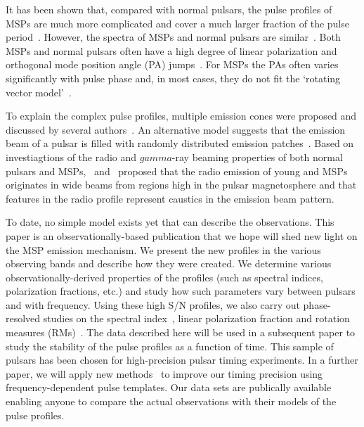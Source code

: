 \documentclass[useAMS,usenatbib]{mn2e}
\begin{document}
It has been shown that, compared with normal pulsars, the pulse profiles of MSPs are 
much more complicated and cover a much larger fraction of the pulse period~\citep{Yan11}. 
%
However, the spectra of MSPs and normal pulsars are similar~\citep{Toscano98,Kramer98,Kramer99}.
%
Both MSPs and normal pulsars often have a high degree of linear polarization and orthogonal 
mode position angle (PA) jumps~\citep[see e.g.,][]{Thorsett90,Navarro97,Stairs99,Manchester04,Ord04}.
%
For MSPs the PAs often varies significantly with pulse phase and, in most cases, they do not fit 
the `rotating vector model'~\citep[RVM,][]{Radhakrishnan69}.

To explain the complex pulse profiles, multiple emission cones were proposed 
and discussed by several authors~\citep{Rankin93,Kramer94b,Gupta03}. An alternative 
model suggests that the emission beam of a pulsar is filled with randomly 
distributed emission patches~\citep{Lyne88,Manchester95_2,Han01}. 
%
Based on investiagtions of the radio and $gamma$-ray beaming properties of both normal 
pulsars and MSPs,~\citet{Manchester05b} and~\citet{Ravi10} proposed that the radio emission 
of young and MSPs originates in wide beams from regions high in the pulsar magnetosphere 
and that features in the radio profile represent caustics in the emission beam pattern.
%

To date, no simple model exists yet that can describe the observations.  
%
This paper is an observationally-based publication that we hope will shed new 
light on the MSP emission mechanism.  
%
We present the new profiles in the various observing bands and describe how they were 
created. We determine various observationally-derived properties of the profiles (such as 
spectral indices, polarization fractions, etc.) and study how such parameters vary 
between pulsars and with frequency. 
%
Using these high S/N profiles, we also carry out phase-resolved studies on 
the spectral index~\citep[e.g.,][]{Lyne88,Kramer94a,Manchester04,Chen07}, linear polarization 
fraction and rotation measures (RMs)~\citep[e.g.,][]{Noutsos09}.
%
The data described here will be used in a subsequent paper to study the stability 
of the pulse profiles as a function of time. This sample of pulsars has been chosen for 
high-precision pulsar timing experiments. In a further paper, we will apply 
new methods~\citep[e.g.,][]{Pennucci14,Liu14} to improve our timing precision using 
frequency-dependent pulse templates.  
%
Our data sets are publically available enabling anyone to compare the actual 
observations with their models of the pulse profiles.
%
\end{document}
